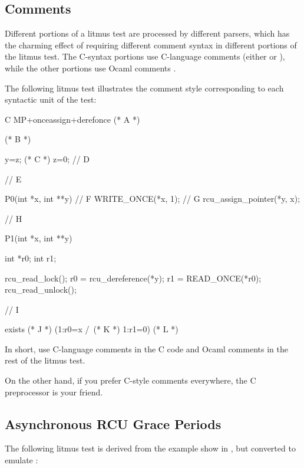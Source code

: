 \subsection{Comments}

Different portions of a litmus test are processed by different parsers,
which has the charming effect of requiring different comment syntax in
different portions of the litmus test.
The C-syntax portions use C-language comments (either \qco{/* */} or \qco{//}),
while the other portions use Ocaml comments \qco{(* *)}.

The following litmus test illustrates the comment style corresponding
to each syntactic unit of the test:

\begin{VerbatimN}[commandchars=\%\@\$]
	C MP+onceassign+derefonce (* A *)

	(* B *)

	{
	y=z; (* C *)
	z=0;
	} // D

	// E

	P0(int *x, int **y) // F
	{
		WRITE_ONCE(*x, 1);  // G
		rcu_assign_pointer(*y, x);
	}

	// H

	P1(int *x, int **y)
	{
		int *r0;
		int r1;

		rcu_read_lock();
		r0 = rcu_dereference(*y);
		r1 = READ_ONCE(*r0);
		rcu_read_unlock();
	}

	// I

	exists (* J *) (1:r0=x /\ (* K *) 1:r1=0) (* L *)
\end{VerbatimN}

In short, use C-language comments in the C code and Ocaml comments in
the rest of the litmus test.

On the other hand, if you prefer C-style comments everywhere, the
C preprocessor is your friend.


\subsection{Asynchronous RCU Grace Periods}

The following litmus test is derived from the example show in
, but
converted to emulate :

